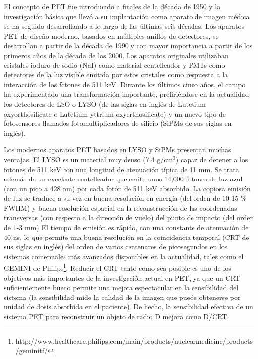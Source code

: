 El concepto de PET fue introducido a finales de la década de 1950 y la investigación básica que llevó a su implantación como aparato de imagen médica se ha seguido desarrollando a lo largo de las últimas seis décadas. Los aparatos PET de diseño moderno, basados en múltiples anillos de detectores, se desarrollan a partir de la década de 1990 y con mayor importancia a partir de los primeros años de la década de los 2000. Los aparatos originales utilizaban cristales ioduro de sodio (NaI) como material centelleador y PMTs como detectores de la luz visible emitida por estos cristales como respuesta a la interacción de los fotones de 511 keV. Durante los últimos cinco años, el campo ha experimentado una transformación importante, prefiriéndose en la actualidad los detectores de LSO o LYSO (de las siglas en inglés de Lutetium oxyorthosilicate o Lutetium-yttrium oxyorthosilicate) y un nuevo tipo de fotosensores llamados fotomultiplicadores de silicio (SiPMs de sus siglas en inglés). 

Los modernos aparatos PET basados en LYSO y SiPMs presentan muchas ventajas. El LYSO es un material muy denso (7.4 g/cm$^3$) capaz de detener a los fotones de 511 keV con una longitud de atenuación típica de 11 mm. Se trata además de un excelente centelleador que emite unos 14,000 fotones de luz azul (con un pico a 428 nm) por cada fotón de 511 keV absorbido. La copiosa emisión de luz se traduce a su vez en buena resolución en energía (del orden de 10-15 \% FWHM) y buena resolución espacial en la reconstrucción de las coordenadas transversas (con respecto a la dirección de vuelo) del punto de impacto (del orden de 1-3 mm) El tiempo de emisión es rápido, con una constante de atenuación de 40 ns, lo que permite una buena resolución en la coincidencia temporal (CRT de sus siglas en inglés) del orden de varios centenares de picosegundos en los sistemas comerciales más avanzados disponibles en la actualidad, tales como el GEMINI de Philips\footnote{http://www.healthcare.philips.com/main/products/nuclearmedicine/products/geminitf/}. Reducir el CRT tanto como sea posible es uno de los objetivos más importantes de la investigación actual en PET, ya que un CRT suficientemente bueno permite una mejora espectacular en la sensibilidad del sistema (la sensibilidad mide la calidad de la imagen que puede obtenerse por unidad de dosis absorbida en el paciente).  De hecho, la sensibilidad efectiva de un sistema PET para reconstruir un objeto de radio D mejora como D/CRT. 

